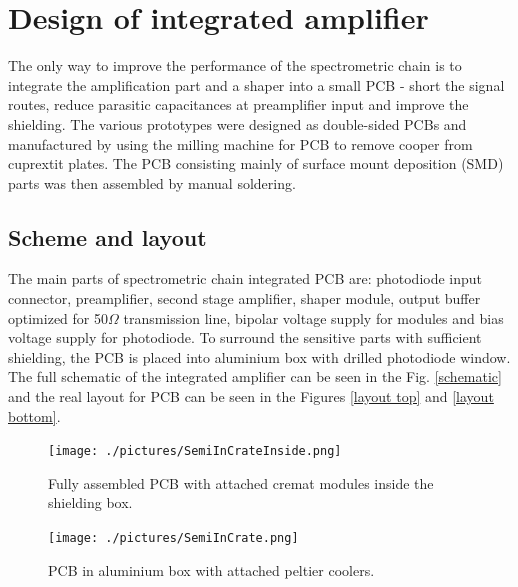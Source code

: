 \chapter{Design of integrated amplifier}
The only way to improve the performance of the spectrometric chain is to integrate the amplification part and a shaper into a small PCB - short the signal routes, reduce parasitic capacitances at preamplifier input and improve the shielding. The various prototypes were designed as double-sided PCBs and manufactured by using the milling machine for PCB to remove cooper from cuprextit plates. The PCB consisting mainly of surface mount deposition (SMD) parts was then assembled by manual soldering.

\section{Scheme and layout}
The main parts of spectrometric chain integrated PCB are: photodiode input connector, preamplifier, second stage amplifier, shaper module, output buffer optimized for 50\nobreakspace$\Omega$ transmission line, bipolar voltage supply for modules and bias voltage supply for photodiode. To surround the sensitive parts with sufficient shielding, the PCB is placed into aluminium box with drilled photodiode window. The full schematic of the integrated amplifier can be seen in the Fig. \ref{schematic} and the real layout for PCB can be seen in the Figures \ref{layout top} and \ref{layout bottom}.



\begin{figure}[H]
 \centering
 \texttt{[image: ./pictures/SemiInCrateInside.png]}
 \caption{Fully assembled PCB with attached cremat modules inside the shielding box.}
 \label{PCBbox}
 
\end{figure}


\begin{figure}[H]
 \centering
 \texttt{[image: ./pictures/SemiInCrate.png]}
 \caption{PCB in aluminium box with attached peltier coolers.}
 \label{PCBphyss}
 
\end{figure}



\newpage

